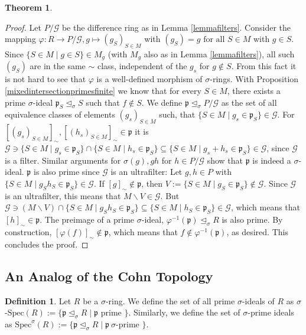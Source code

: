 \documentclass{article}
\def\p{\mathfrak{p}}
\def\s{\sigma}
\def\si{\unlhd_{\sigma}}
\def\Spec{\text{Spec}}
\def\fa{\text{ for all }}
\newenvironment{bew}{\begin{proof}[Proof]}{\end{proof}}
\theoremstyle{definition}
\newtheorem{theorem}[Satz]{Theorem}
\newtheorem{defn}[Satz]{Definition}
\begin{document}
\begin{theorem}
\begin{bew}
Let $P/\mathcal{G}$ be the difference ring as in Lemma \ref{lemmafilters}. Consider the mapping $\varphi: R \rightarrow P/\mathcal{G}, g \mapsto (g_S)_{S \in M}$ with $(g_S) = g \fa S \in M$ with $g \in S$. 
Since $\{ S \in M \mid g \in S \} \in M_g$ (with $M_g$ also as in Lemma \ref{lemmafilters}), all such $(g_S)$ are in the same $\sim$ class, independent of the $g_s$ for $g \notin S$. 
From this fact it is not hard to see that $\varphi$ is a well-defined morphism of $\s$-rings. 
With Proposition \ref{mixedintersectionprimesfinite} we know that for every $S \in M$, there exists a prime $\s$-ideal $\p_S \si S$ such that $f \notin S$. 
We define $\p \si P/\mathcal{G}$ as the set of all equivalence classes of elements $(g_s)_{S \in M}$ such, that $\{ S \in M \mid g_s \in \p_S \} \in \mathcal{G}$. 
For $[(g_s)_{S \in M}]_{\sim}, [(h_s)_{S \in M}]_{\sim} \in \p$ it is $ \mathcal{G} \ni \{ S \in M \mid  g_s \in \p_S \} \cap  \{ S \in M \mid  h_s \in \p_S \} \subseteq \{ S \in M \mid  g_s + h_s \in \p_S \} \in \mathcal{G}$,
since $\mathcal{G}$ is a filter. Similar arguments for $\s(g), gh$ for $h \in P/\mathcal{G}$ show that $\p$ is indeed a $\s$-ideal. $\p$ is also prime since $\mathcal{G}$ is an ultrafilter:
Let $g,h \in P$ with $\{ S \in M \mid g_Sh_S \in \p_S \} \in \mathcal{G}$. If $[g]_\sim \notin \p$, then $V:= \{ S \in M \mid g_S \in \p_S \} \notin \mathcal{G}$. Since $\mathcal{G}$ is an ultrafilter, 
this means that $M \backslash V \in \mathcal{G}$. But $\mathcal{G} \ni (M \backslash V) \cap \{ S \in M \mid g_S h_S \in \p_S \} \subseteq \{ S \in M \mid h_S \in \p_S \} \in \mathcal{G}$, which means that $[h]_\sim \in \p$.
The preimage of a prime $\s$-ideal, $\varphi^{-1}(\p) \si R$ is also prime. By construction, $[\varphi(f)]_\sim \notin \p$, which means that $f \notin \varphi^{-1}(\p)$, as desired. This concludes the proof.

\end{bew}
\end{theorem}

\subsection{An Analog of the Cohn Topology}

\begin{defn}
Let $R$ be a $\s$-ring. We define the set of all prime $\s$-ideals of $R$ as $\s$-$\Spec(R):= \{ \p \si R \mid \p \text{ prime }\}$. Similarly, we define the set of $\s$-prime ideals as $\Spec^\s(R):= \{ \p \si R \mid \p ~ \s\text{-prime }\}$.
\end{defn}
\end{document}
